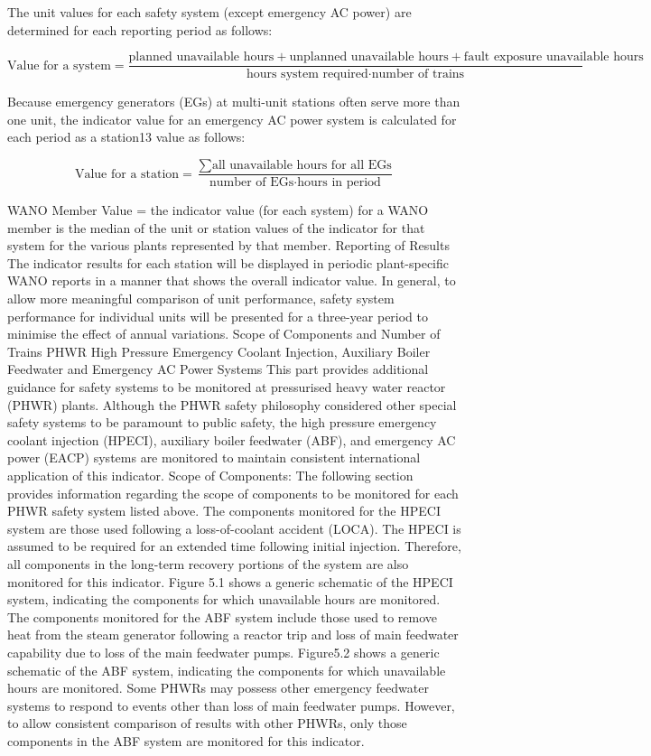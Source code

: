 The unit values for each safety system (except emergency AC power) are
determined for each reporting period as follows:

$$ \text{Value for a system} =
\frac{\text{planned unavailable hours}+\text{unplanned unavailable hours}+\text{fault
exposure unavailable hours}}{\text{hours system required} \cdot \text{number of
trains}} $$

Because emergency generators (EGs) at multi-unit stations often serve
more than one unit, the indicator value for an emergency AC power
system is calculated for each period as a station13 value as follows:

$$ \text{Value for a station} = \frac{\sum{\text{all unavailable hours for all
EGs}}}{\text{number of EGs} \cdot \text{hours in period}} $$

WANO Member Value = the indicator value (for each system) for a WANO member is the median of the unit or station values of the indicator for that system for the various plants represented by that member.
Reporting of Results
The indicator results for each station will be displayed in periodic plant-specific WANO reports in a manner that shows the overall indicator value.
In general, to allow more meaningful comparison of unit performance, safety system performance for individual units will be presented for a three-year period to minimise the effect of annual variations.
Scope of Components and Number of Trains
PHWR High Pressure Emergency Coolant Injection, Auxiliary Boiler Feedwater and Emergency AC Power Systems
This part provides additional guidance for safety systems to be monitored at pressurised heavy water reactor (PHWR) plants.  Although the PHWR safety philosophy considered other special safety systems to be paramount to public safety, the high pressure emergency coolant injection (HPECI), auxiliary boiler feedwater (ABF), and emergency AC power (EACP) systems are monitored to maintain consistent international application of this indicator.
Scope of Components: The following section provides information regarding the scope of components to be monitored for each PHWR safety system listed above.
The components monitored for the HPECI system are those used following a loss-of-coolant accident (LOCA). The HPECI is assumed to be required for an extended time following initial injection. Therefore, all components in the long-term recovery portions of the system are also monitored for this indicator.  Figure 5.1 shows a generic schematic of the HPECI system, indicating the components for which unavailable hours are monitored.
The components monitored for the ABF system include those used to remove heat from the steam generator following a reactor trip and loss of main feedwater capability due to loss of the main feedwater pumps. Figure5.2 shows a generic schematic of the ABF system, indicating the components for which unavailable hours are monitored. Some PHWRs may possess other emergency feedwater systems to respond to events other than loss of main feedwater pumps. However, to allow consistent comparison of results with other PHWRs, only those components in the ABF system are monitored for this indicator.
